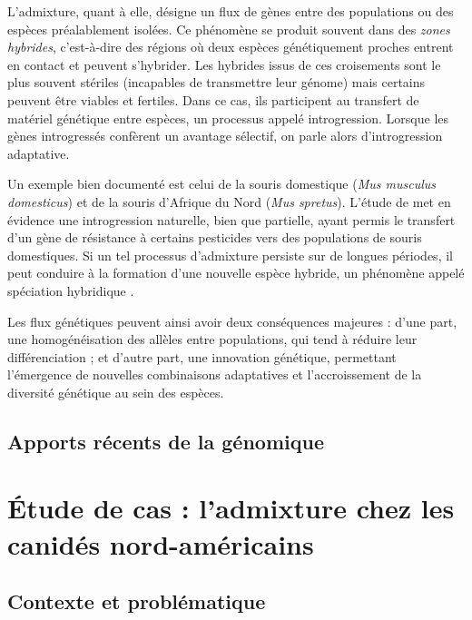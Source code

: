 \documentclass[12pt,a4paper]{article}
\begin{document}
L’admixture, quant à elle, désigne un flux de gènes entre des populations ou des espèces préalablement isolées.
Ce phénomène se produit souvent dans des \textit{zones hybrides}, c’est-à-dire des régions où deux espèces génétiquement proches entrent en contact et peuvent s’hybrider.  %
Les hybrides issus de ces croisements sont le plus souvent stériles (incapables de transmettre leur génome) mais certains peuvent être viables et fertiles.
Dans ce cas, ils participent au transfert de matériel génétique entre espèces, un processus appelé introgression.
Lorsque les gènes introgressés confèrent un avantage sélectif, on parle alors d’introgression adaptative.

Un exemple bien documenté est celui de la souris domestique (\textit{Mus musculus domesticus}) et de la souris d’Afrique du Nord (\textit{Mus spretus}).
L’étude de \textcite{souris-orth-2002} met en évidence une introgression naturelle, bien que partielle, ayant permis le transfert d’un gène de résistance à certains pesticides vers des populations de souris domestiques.
Si un tel processus d’admixture persiste sur de longues périodes, il peut conduire à la formation d’une nouvelle espèce hybride, un phénomène appelé spéciation hybridique \parencite{vilaca-2023}.

Les flux génétiques peuvent ainsi avoir deux conséquences majeures :
d’une part, une homogénéisation des allèles entre populations, qui tend à réduire leur différenciation ;
et d’autre part, une innovation génétique, permettant l’émergence de nouvelles combinaisons adaptatives et l’accroissement de la diversité génétique au sein des espèces.

\subsection{Apports récents de la génomique}

\section{Étude de cas : l’admixture chez les canidés nord-américains}

\subsection{Contexte et problématique}
\end{document}
